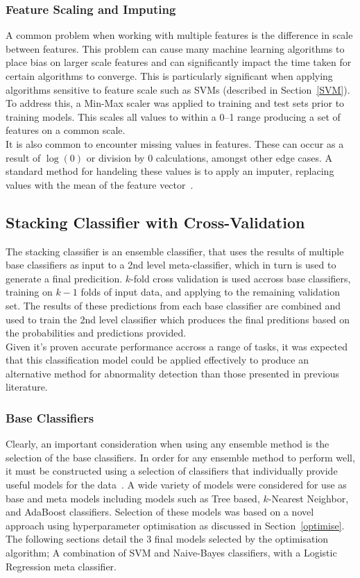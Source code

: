 \documentclass[titlepage, 12pt]{scrartcl} \usepackage{enumitem}
\begin{document}
\subsubsection{Feature Scaling and Imputing}
A common problem when working with multiple features is the difference in scale
between features. This problem can cause many machine learning algorithms to place
bias on larger scale features and can significantly impact the time taken for
certain algorithms to converge. This is particularly significant when applying
algorithms sensitive to feature scale such as SVMs (described in
Section~\ref{SVM}). To address this, a Min-Max scaler was applied
to training and test sets prior to training models. This scales all values to within a
0--1 range producing a set of features on a common scale.\\
It is also common to encounter missing values in features. These can occur as a
result of $\log(0)$ or division by 0 calculations, amongst other edge cases. A
standard method for handeling these values is to apply an imputer, replacing
values with the mean of the feature vector~\parencite{VanderPlas2017}.

\subsection{Stacking Classifier with Cross-Validation}\label{class}
The stacking classifier is an ensemble classifier, that uses the results of
multiple base classifiers as input to a 2nd level meta-classifier, which in
turn is used to generate a final predicition. $k$-fold cross validation is used
accross base classifiers, training on $k-1$ folds of input data, and applying
to the remaining validation set. The results of these predictions from each
base classifier are combined and used to train the 2nd level classifier which
produces the final preditions based on the probabilities and predictions
provided.\\ 
Given it's proven accurate performance accross a range of tasks, it was
expected that this classification model could be applied effectively to produce
an alternative method for abnormality detection than those presented in
previous literature.

\subsubsection{Base Classifiers}
Clearly, an important consideration when using any ensemble method is the
selection of the base classifiers. In order for any ensemble method to perform
well, it must be constructed using a selection of classifiers that individually
provide useful models for the data~\parencite[p.484]{Tobergte2013a}.   A wide
variety of models were considered for use as base and meta models including
models such as Tree based, $k$-Nearest Neighbor, and AdaBoost classifiers.
Selection of these models was based on a novel approach using hyperparameter
optimisation as discussed in Section~\ref{optimise}. The following sections
detail the 3 final models selected by the optimisation algorithm; A combination
of SVM and Naive-Bayes classifiers, with a Logistic Regression meta classifier.
\end{document}
